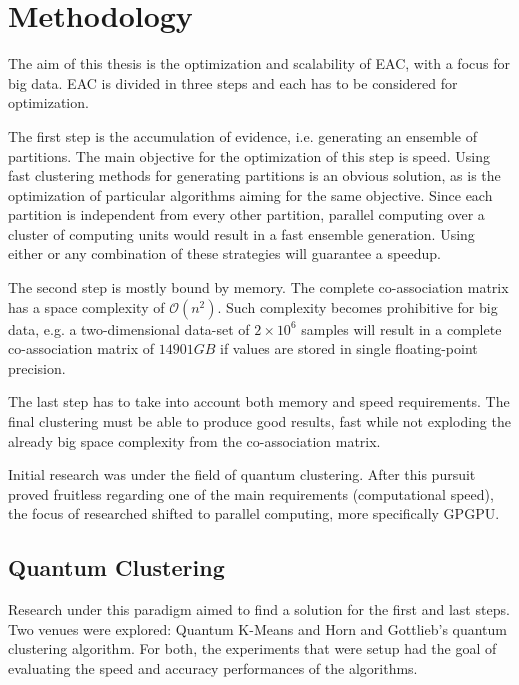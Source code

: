 \section{Methodology}


The aim of this thesis is the optimization and scalability of EAC, with a focus for big data. EAC is divided in three steps and each has to be considered for optimization.

The first step is the accumulation of evidence, i.e. generating an ensemble of partitions. The main objective for the optimization of this step is speed. Using fast clustering methods for generating partitions is an obvious solution, as is the optimization of particular algorithms aiming for the same objective. Since each partition is independent from every other partition, parallel computing over a cluster of computing units would result in a fast ensemble generation. Using either or any combination of these strategies will guarantee a speedup.


The second step is mostly bound by memory. The complete co-association matrix has a space complexity of $\mathcal{O}(n^2)$. Such complexity becomes prohibitive for big data, e.g. a two-dimensional data-set of $2\times10^6$ samples will result in a complete co-association matrix of $14901 GB$ if values are stored in single floating-point precision.

The last step has to take into account both memory and speed requirements. The final clustering must be able to produce good results, fast while not exploding the already big space complexity from the co-association matrix.

Initial research was under the field of quantum clustering. After this pursuit proved fruitless regarding one of the main requirements (computational speed), the focus of researched shifted to parallel computing, more specifically GPGPU.

\subsection{Quantum Clustering}

Research under this paradigm aimed to find a solution for the first and last steps. Two venues were explored: Quantum K-Means and Horn and Gottlieb's quantum clustering algorithm.
For both, the experiments that were setup had the goal of evaluating the speed and accuracy performances of the algorithms.


